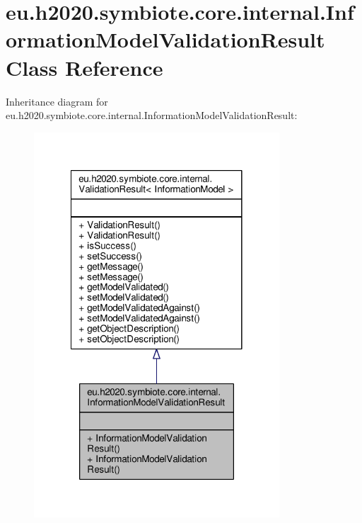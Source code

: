 \hypertarget{classeu_1_1h2020_1_1symbiote_1_1core_1_1internal_1_1InformationModelValidationResult}{}\section{eu.\+h2020.\+symbiote.\+core.\+internal.\+Information\+Model\+Validation\+Result Class Reference}
\label{classeu_1_1h2020_1_1symbiote_1_1core_1_1internal_1_1InformationModelValidationResult}


Inheritance diagram for eu.\+h2020.\+symbiote.\+core.\+internal.\+Information\+Model\+Validation\+Result\+:\nopagebreak
\begin{figure}[H]
\begin{center}
\leavevmode
\includegraphics[width=260pt]{classeu_1_1h2020_1_1symbiote_1_1core_1_1internal_1_1InformationModelValidationResult__inherit__graph}
\end{center}
\end{figure}


